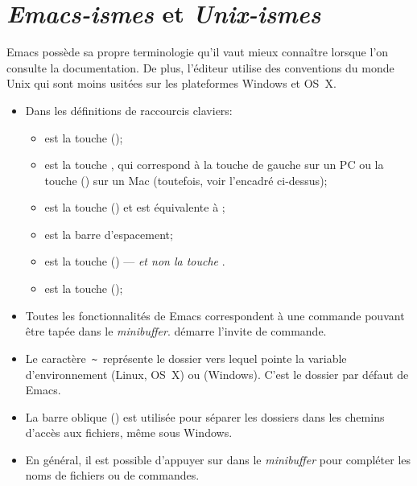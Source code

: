 \section{\emph{Emacs-ismes} et \emph{Unix-ismes}}
\label{emacs+ess:ismes}

Emacs possède sa propre terminologie qu'il vaut mieux connaître
lorsque l'on consulte la documentation. De plus, l'éditeur utilise des
conventions du monde Unix qui sont moins usitées sur les plateformes
Windows et OS~X.

\begin{itemize}
\item Dans les définitions de raccourcis claviers:
  \begin{itemize}
  \item {} est la touche  (\ctlkey);
  \item {} est la touche , qui correspond à la touche
     de gauche sur un PC ou la touche 
    (\optkey) sur un Mac (toutefois, voir l'encadré ci-dessus);
  \item {} est la touche  (\esckey) et
    est équivalente à ;
  \item {} est la barre d'espacement;
  \item {} est la touche  (\delkey) ---
    \emph{et non la touche} .
  \item {} est la touche  (\returnkey);
  \end{itemize}
\item Toutes les fonctionnalités de Emacs correspondent à une commande
  pouvant être tapée dans le \emph{minibuffer}.  démarre
  l'invite de commande.
\item Le caractère \,\verb=~=\, représente le dossier vers lequel
  pointe la variable d'environnement  (Linux, OS~X) ou
   (Windows). C'est le dossier par défaut de Emacs.
\item La barre oblique (\code{/}) est utilisée pour séparer les
  dossiers dans les chemins d'accès aux fichiers, même sous Windows.
\item En général, il est possible d'appuyer sur  dans le
  \emph{minibuffer} pour compléter les noms de fichiers ou de
  commandes.
\end{itemize}

